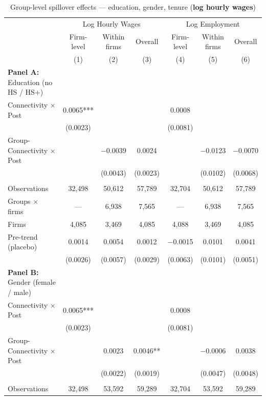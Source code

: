 \begin{table}[H]
\centering
\caption{Group-level spillover effects --- education, gender, tenure (\textbf{log hourly wages})}
\scriptsize
\begin{tabular}{lcccccc}
\toprule\toprule
 & \multicolumn{3}{c}{Log Hourly Wages} & \multicolumn{3}{c}{Log Employment} \\
\cmidrule(lr){2-4} \cmidrule(lr){5-7}
 & \shortstack{Firm-\\level} & \shortstack{Within\\firms} & Overall
 & \shortstack{Firm-\\level} & \shortstack{Within\\firms} & Overall \\
 & (1) & (2) & (3) & (4) & (5) & (6) \\
\midrule
\textbf{Panel A:} Education (no HS / HS+) &  &  &  &  &  &  \\
Connectivity $\times$ Post & 0.0065*** &  &  & 0.0008 &  &  \\
 & (0.0023) &  &  & (0.0081) &  &  \\
Group-Connectivity $\times$ Post &  & $-$0.0039 & 0.0024 &  & $-$0.0123 & $-$0.0070 \\
 &  & (0.0043) & (0.0023) &  & (0.0102) & (0.0068) \\
 &  &  &  &  &  &  \\
Observations & 32{,}498 & 50{,}612 & 57{,}789 & 32{,}704 & 50{,}612 & 57{,}789 \\
Groups $\times$ firms & --- & 6{,}938 & 7{,}565 & --- & 6{,}938 & 7{,}565 \\
Firms & 4{,}085 & 3{,}469 & 4{,}085 & 4{,}088 & 3{,}469 & 4{,}085 \\
Pre-trend (placebo) & 0.0014 & 0.0054 & 0.0012 & $-$0.0015 & 0.0101 & 0.0041 \\
 & (0.0026) & (0.0057) & (0.0029) & (0.0063) & (0.0101) & (0.0051) \\
\midrule
\textbf{Panel B:} Gender (female / male) &  &  &  &  &  &  \\
Connectivity $\times$ Post & 0.0065*** &  &  & 0.0008 &  &  \\
 & (0.0023) &  &  & (0.0081) &  &  \\
Group-Connectivity $\times$ Post &  & 0.0023 & 0.0046** &  & $-$0.0006 & 0.0038 \\
 &  & (0.0022) & (0.0019) &  & (0.0047) & (0.0048) \\
 &  &  &  &  &  &  \\
Observations & 32{,}498 & 53{,}592 & 59{,}289 & 32{,}704 & 53{,}592 & 59{,}289 \\

\end{tabular}
\end{table}
